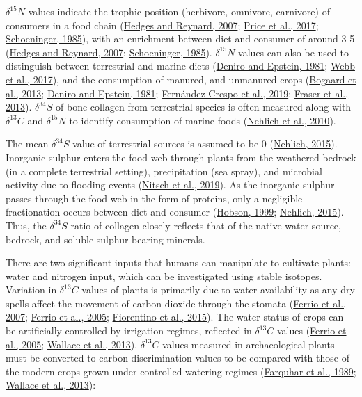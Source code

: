 \documentclass[3p]{elsarticle} %
\begin{document}
\(\delta ^{15}N\) values indicate the trophic position (herbivore, omnivore, carnivore) of consumers in a food chain (\protect\hyperlink{ref-hedges_reynard07}{Hedges and Reynard, 2007}; \protect\hyperlink{ref-price_etal17}{Price et al., 2017}; \protect\hyperlink{ref-schoeninger85}{Schoeninger, 1985}), with an enrichment between diet and consumer of around 3-5\text{\textperthousand} (\protect\hyperlink{ref-hedges_reynard07}{Hedges and Reynard, 2007}; \protect\hyperlink{ref-schoeninger85}{Schoeninger, 1985}). \(\delta ^{15}N\) values can also be used to distinguish between terrestrial and marine diets (\protect\hyperlink{ref-deniro_epstein81}{Deniro and Epstein, 1981}; \protect\hyperlink{ref-webb_etal17a}{Webb et al., 2017}), and the consumption of manured, and unmanured crops (\protect\hyperlink{ref-bogaard_etal13}{Bogaard et al., 2013}; \protect\hyperlink{ref-deniro_epstein81}{Deniro and Epstein, 1981}; \protect\hyperlink{ref-fernandez-crespo_etal19}{Fernández-Crespo et al., 2019}; \protect\hyperlink{ref-fraser_etal13a}{Fraser et al., 2013}). \(\delta ^{34}S\) of bone collagen from terrestrial species is often measured along with \(\delta ^{13}C\) and \(\delta ^{15}N\) to identify consumption of marine foods (\protect\hyperlink{ref-nehlich_etal10}{Nehlich et al., 2010}).

The mean \(\delta ^{34}S\) value of terrestrial sources is assumed to be 0\text{\textperthousand} (\protect\hyperlink{ref-nehlich15}{Nehlich, 2015}). Inorganic sulphur enters the food web through plants from the weathered bedrock (in a complete terrestrial setting), precipitation (sea spray), and microbial activity due to flooding events (\protect\hyperlink{ref-nitsch_etal19}{Nitsch et al., 2019}). As the inorganic sulphur passes through the food web in the form of proteins, only a negligible fractionation occurs between diet and consumer (\protect\hyperlink{ref-hobson99}{Hobson, 1999}; \protect\hyperlink{ref-nehlich15}{Nehlich, 2015}). Thus, the \(\delta ^{34}S\) ratio of collagen closely reflects that of the native water source, bedrock, and soluble sulphur-bearing minerals.

There are two significant inputs that humans can manipulate to cultivate plants: water and nitrogen input, which can be investigated using stable isotopes. Variation in \(\delta ^{13}C\) values of plants is primarily due to water availability as any dry spells affect the movement of carbon dioxide through the stomata (\protect\hyperlink{ref-ferrio_etal07}{Ferrio et al., 2007}; \protect\hyperlink{ref-ferrio_etal05}{Ferrio et al., 2005}; \protect\hyperlink{ref-fiorentino_etal15}{Fiorentino et al., 2015}). The water status of crops can be artificially controlled by irrigation regimes, reflected in \(\delta ^{13}C\) values (\protect\hyperlink{ref-ferrio_etal05}{Ferrio et al., 2005}; \protect\hyperlink{ref-wallace_etal13}{Wallace et al., 2013}). \(\delta ^{13}C\) values measured in archaeological plants must be converted to carbon discrimination values to be compared with those of the modern crops grown under controlled watering regimes (\protect\hyperlink{ref-farquhar_etal89}{Farquhar et al., 1989}; \protect\hyperlink{ref-wallace_etal13}{Wallace et al., 2013}):
\end{document}
